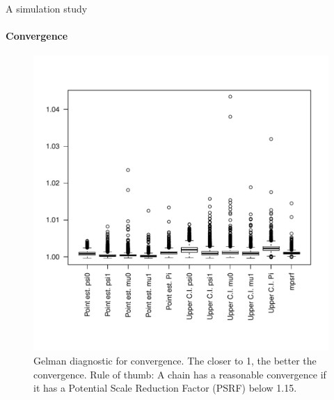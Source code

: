 \documentclass[9pt,ignorenonframetext,]{beamer}
\begin{document}
\begin{frame}[t,label=sim-convergence]{A simulation study}

\framesubtitle{Convergence \hyperlink{sim-setup}{}}

\begin{figure}
\centering
\includegraphics[width=.6\linewidth, trim={0 1.5cm 0 2cm},clip]{gelmans_right_prior.pdf}
\caption{Gelman diagnostic for convergence. The closer to 1, the better the convergence. Rule of thumb: A chain has a reasonable convergence if it has a Potential Scale Reduction Factor (PSRF) below 1.15.}
\end{figure}

\end{frame}
\end{document}
